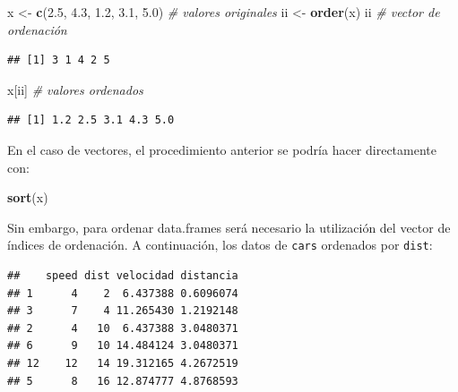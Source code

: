 \documentclass[]{book}
\newenvironment{Shaded}{\begin{snugshade}}{\end{snugshade}}
\newcommand{\KeywordTok}[1]{\textcolor[rgb]{0.13,0.29,0.53}{\textbf{#1}}}
\newcommand{\FloatTok}[1]{\textcolor[rgb]{0.00,0.00,0.81}{#1}}
\newcommand{\StringTok}[1]{\textcolor[rgb]{0.31,0.60,0.02}{#1}}
\newcommand{\CommentTok}[1]{\textcolor[rgb]{0.56,0.35,0.01}{\textit{#1}}}
\newcommand{\OperatorTok}[1]{\textcolor[rgb]{0.81,0.36,0.00}{\textbf{#1}}}
\newcommand{\NormalTok}[1]{#1}
\begin{document}
\begin{Shaded}
\begin{Highlighting}[]
\NormalTok{x <-}\StringTok{ }\KeywordTok{c}\NormalTok{(}\FloatTok{2.5}\NormalTok{, }\FloatTok{4.3}\NormalTok{, }\FloatTok{1.2}\NormalTok{, }\FloatTok{3.1}\NormalTok{, }\FloatTok{5.0}\NormalTok{) }\CommentTok{# valores originales}
\NormalTok{ii <-}\StringTok{ }\KeywordTok{order}\NormalTok{(x)}
\NormalTok{ii    }\CommentTok{# vector de ordenación}
\end{Highlighting}
\end{Shaded}

\begin{verbatim}
## [1] 3 1 4 2 5
\end{verbatim}

\begin{Shaded}
\begin{Highlighting}[]
\NormalTok{x[ii] }\CommentTok{# valores ordenados}
\end{Highlighting}
\end{Shaded}

\begin{verbatim}
## [1] 1.2 2.5 3.1 4.3 5.0
\end{verbatim}

En el caso de vectores, el procedimiento anterior se podría hacer
directamente con:

\begin{Shaded}
\begin{Highlighting}[]
\KeywordTok{sort}\NormalTok{(x)}
\end{Highlighting}
\end{Shaded}

Sin embargo, para ordenar data.frames será necesario la utilización del
vector de índices de ordenación. A continuación, los datos de
\texttt{cars} ordenados por \texttt{dist}:

\begin{Shaded}
\end{Shaded}

\begin{verbatim}
##    speed dist velocidad distancia
## 1      4    2  6.437388 0.6096074
## 3      7    4 11.265430 1.2192148
## 2      4   10  6.437388 3.0480371
## 6      9   10 14.484124 3.0480371
## 12    12   14 19.312165 4.2672519
## 5      8   16 12.874777 4.8768593
\end{verbatim}
\end{document}
